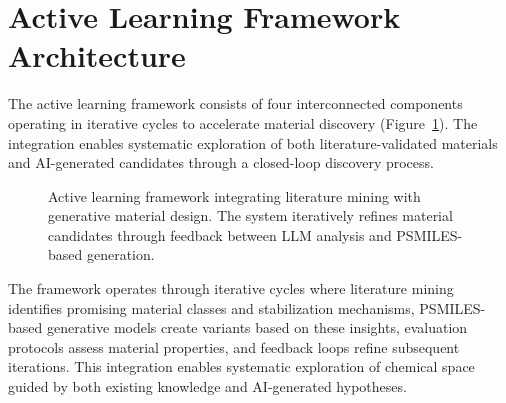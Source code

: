 \documentclass[]{fairmeta}
\begin{document}
\section{Active Learning Framework Architecture}

The active learning framework consists of four interconnected components operating in iterative cycles to accelerate material discovery (Figure~\ref{fig:framework}). The integration enables systematic exploration of both literature-validated materials and AI-generated candidates through a closed-loop discovery process.

\begin{figure}[t]
\centering
{}
\caption{Active learning framework integrating literature mining with generative material design. The system iteratively refines material candidates through feedback between LLM analysis and PSMILES-based generation.}
\label{fig:framework}
\end{figure}

The framework operates through iterative cycles where literature mining identifies promising material classes and stabilization mechanisms, PSMILES-based generative models create variants based on these insights, evaluation protocols assess material properties, and feedback loops refine subsequent iterations. This integration enables systematic exploration of chemical space guided by both existing knowledge and AI-generated hypotheses.
\end{document}
